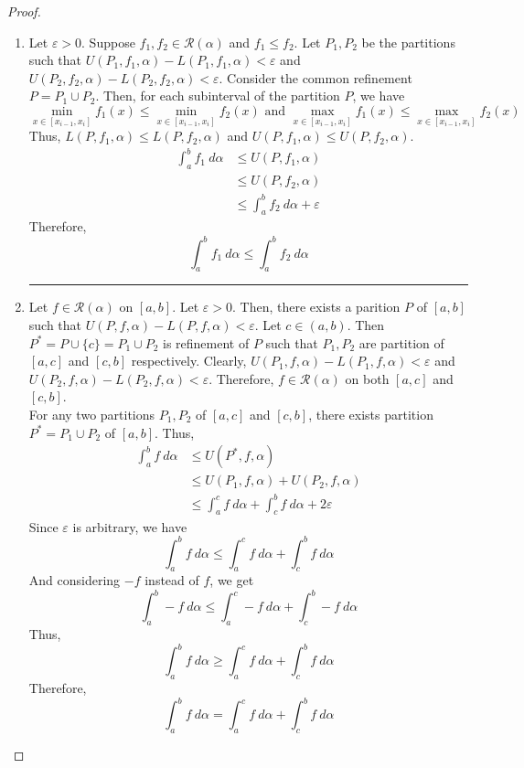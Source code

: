 \begin{proof}
\begin{enumerate}
	\hrule \vspace{1em}
	\item 
	Let $\varepsilon > 0$.
	Suppose $f_1,f_2 \in \mathscr{R}(\alpha)$ and $f_1 \le f_2$.
	Let $P_1,P_2$ be the partitions such that $U(P_1,f_1,\alpha) - L(P_1,f_1,\alpha) < \varepsilon$ and $U(P_2,f_2,\alpha) - L(P_2,f_2,\alpha) < \varepsilon$.
	Consider the common refinement $P = P_1 \cup P_2$.
	Then, for each subinterval of the partition $P$, we have
	\[ \min_{x \in [x_{i-1},x_i]} f_1(x) \le \min_{x \in [x_{i-1},x_i]} f_2(x) \text{ and } \max_{x \in [x_{i-1},x_i]} f_1(x) \le \max_{x \in [x_{i-1},x_i]} f_2(x) \]
	Thus, $L(P,f_1,\alpha) \le L(P,f_2,\alpha)$ and $U(P,f_1,\alpha) \le U(P,f_2,\alpha)$.
	\begin{align*}
	\int_a^b f_1\ d\alpha 
		& \le U(P,f_1,\alpha) \\
		& \le U(P,f_2,\alpha) \\
		& \le \int_a^b f_2\ d\alpha + \varepsilon
	\end{align*}
	Therefore,
	\[ \int_a^b f_1\ d\alpha \le \int_a^b f_2\ d\alpha \]

	\hrule \vspace{1em}
	\item 
	Let $f \in \mathscr{R}(\alpha)$ on $[a,b]$.
	Let $\varepsilon > 0$.
	Then, there exists a parition $P$ of $[a,b]$ such that $U(P,f,\alpha) - L(P,f,\alpha) < \varepsilon$.
	Let $c \in (a,b)$.
	Then $P^\ast = P \cup \{c\} = P_1 \cup P_2$ is refinement of $P$ such that $P_1,P_2$ are partition of $[a,c]$ and $[c,b]$ respectively.
	Clearly, $U(P_1,f,\alpha) - L(P_1,f,\alpha) < \varepsilon$ and $U(P_2,f,\alpha) - L(P_2,f,\alpha) < \varepsilon$.
	Therefore, $f \in \mathscr{R}(\alpha)$ on both $[a,c]$ and $[c,b]$.\\

	For any two partitions $P_1,P_2$ of $[a,c]$ and $[c,b]$, there exists partition $P^\ast = P_1 \cup P_2$ of $[a,b]$.
	Thus,
	\begin{align*}
	\int_a^b f\ d\alpha 
		& \le U(P^\ast,f,\alpha) \\
		& \le U(P_1,f,\alpha) + U(P_2,f,\alpha) \\
		& \le \int_a^c f\ d\alpha + \int_c^b f\ d\alpha + 2\varepsilon
	\end{align*}
	Since $\varepsilon$ is arbitrary, we have
	\[ \int_a^b f\ d\alpha \le \int_a^c f\ d\alpha + \int_c^b f\ d\alpha \]
	And considering $-f$ instead of $f$, we get
	\[ \int_a^b -f\ d\alpha \le \int_a^c -f\ d\alpha + \int_c^b -f\ d\alpha \]
	Thus,
	\[ \int_a^b f\ d\alpha \ge \int_a^c f\ d\alpha + \int_c^b f\ d\alpha \]
	Therefore,
	\[ \int_a^b f\ d\alpha = \int_a^c f\ d\alpha + \int_c^b f\ d\alpha \]


\end{enumerate}
\end{proof}
